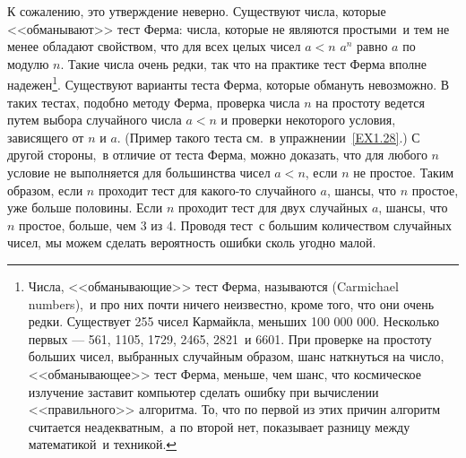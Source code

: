 К сожалению, это утверждение неверно.  Существуют числа,
которые <<обманывают>> тест Ферма: числа, которые не являются
простыми~и тем не менее обладают свойством, что для всех целых чисел
$a < n$ $a^n$ равно $a$ по модулю
$n$.  Такие числа очень редки, так что на практике тест
Ферма вполне надежен\footnote{\label{F47}Числа, <<обманывающие>> тест
  Ферма, называются 
  (Carmichael numbers),~и про них
  почти 
  ничего неизвестно, кроме того, что они очень редки. Существует 255
  чисел Кармайкла, меньших 100 000 000.  Несколько первых ---
  561, 1105, 1729, 2465, 2821~и 6601.  При проверке на простоту больших
  чисел, выбранных случайным образом, шанс наткнуться на число,
  <<обманывающее>> тест Ферма, меньше, чем шанс,
  что 
  космическое излучение заставит компьютер сделать ошибку при вычислении
  <<правильного>> алгоритма.  То, что по первой из этих причин алгоритм
  считается неадекватным,~а по второй нет, показывает разницу между
 математикой~и техникой.}.
Существуют варианты теста Ферма, которые обмануть невозможно. В таких 
тестах, подобно методу Ферма, проверка числа $n$ на
простоту ведется путем выбора случайного числа $a < n$ и
проверки некоторого условия, зависящего от $n$ и
$a$. (Пример такого теста см.~в упражнении~\ref{EX1.28}.) С другой стороны,~в отличие от теста 
Ферма, можно доказать, что для любого $n$ условие не
выполняется для большинства чисел $a < n$, если
$n$ не простое.  Таким образом, если $n$
проходит тест для какого-то случайного $a$, шансы, что
$n$ простое, уже больше половины.  Если $n$
проходит тест для двух случайных $a$, шансы, что
$n$ простое, больше, чем 3 из 4.  Проводя тест~с большим
количеством случайных чисел, мы можем сделать вероятность ошибки
сколь угодно малой.

